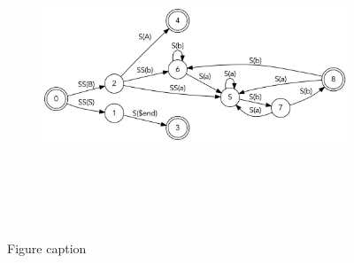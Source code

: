 \documentclass[
  12pt,
  a4paper,
  oneside,
  numbers=noenddot,
  titlepage,
  toclink=all,
  toc=bibliography]{scrbook}
\theoremstyle{definition}
\theoremstyle{definition}
\theoremstyle{definition}
\theoremstyle{plain}
\theoremstyle{plain}
\theoremstyle{plain}
\theoremstyle{plain}
\theoremstyle{plain}
\theoremstyle{remark}
\begin{document}
\begin{figure}

{\centering 

\begin{figure}[H]

{\centering \includegraphics[width=5.5in,height=3.5in]{index_files/figure-latex/dot-figure-1.png}

}

\end{figure}

}

\caption{\label{fig-scriv14}Figure caption}

\end{figure}
\end{document}
